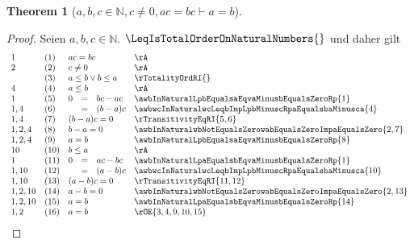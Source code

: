\documentclass{book}
\theoremstyle{plain}
\newtheorem{theorem}{Theorem}
\theoremstyle{remark}
\theoremstyle{definition}
\begin{document}
\label{awbwcInNaturalwcNotEqualsZerowacEqualsbcImpaEqualsb}
\begin{theorem}[\(a,b,c\in\mathbb{N},c\neq 0,ac=bc\vdash a=b\)]
\end{theorem}
\begin{proof}
        Seien \(a,b,c\in\mathbb{N}\). \(\LeqIsTotalOrderOnNaturalNumbers{}\) und daher gilt
        \[
	\begin{array}{llclll}
            1       &  (1)  & \multicolumn{3}{l}{ac=bc} & \rA \\
            2       &  (2)  & \multicolumn{3}{l}{c\neq 0} & \rA \\
                    &  (3)  & \multicolumn{3}{l}{a\leq b\lor b\leq a} & \rTotalityOrdRI{} \\
            4       &  (4)  & \multicolumn{3}{l}{a\leq b} & \rA \\
            1       &  (5)  & 0&=&bc-ac & \awbInNaturalLpbEqualsaEqvaMinusbEqualsZeroRp{1} \\
            1,4     &  (6)  &  &=&(b-a)c & \awbwcInNaturalwcLeqbImpLpbMinuscRpaEqualsbaMinusca{4} \\
            1,4     &  (7)  & \multicolumn{3}{l}{(b-a)c=0} & \rTransitivityEqRI{5,6} \\        
            1,2,4   &  (8)  & \multicolumn{3}{l}{b-a=0} & \awbInNaturalwbNotEqualsZerowabEqualsZeroImpaEqualsZero{2,7} \\
            1,2,4   &  (9)  & \multicolumn{3}{l}{a=b} & \awbInNaturalLpbEqualsaEqvaMinusbEqualsZeroRp{8} \\
            10      &  (10)  & \multicolumn{3}{l}{b\leq a} & \rA \\
            1       &  (11)  & 0&=&ac-bc & \awbInNaturalLpaEqualsbEqvaMinusbEqualsZeroRp{1} \\
            1,10    &  (12)  &  &=&(a-b)c & \awbwcInNaturalwcLeqbImpLpbMinuscRpaEqualsbaMinusca{10} \\
            1,10     &  (13)  & \multicolumn{3}{l}{(a-b)c=0} & \rTransitivityEqRI{11,12} \\  
            1,2,10   &  (14)  & \multicolumn{3}{l}{a-b=0} & \awbInNaturalwbNotEqualsZerowabEqualsZeroImpaEqualsZero{2,13} \\  
            1,2,10     &  (15)  & \multicolumn{3}{l}{a=b} & \awbInNaturalLpaEqualsbEqvaMinusbEqualsZeroRp{14} \\  
            1,2        &  (16)  & \multicolumn{3}{l}{a=b} & \rOE{3,4,9,10,15} \\  
	\end{array}
	\]
\end{proof}
\end{document}
